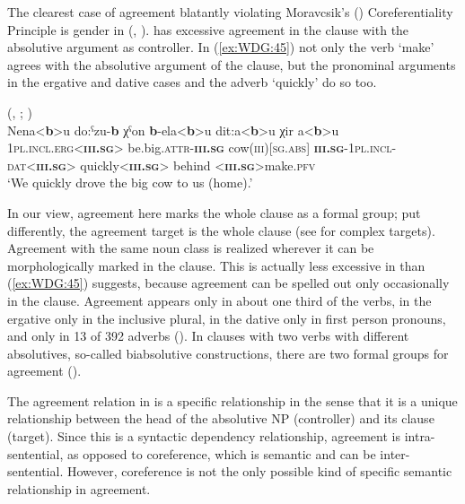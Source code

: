 \documentclass[output=collectionpaper]{langsci/langscibook}
\begin{document}
The clearest case of agreement blatantly violating Moravcsik's (\citeyear[363]{Moravcsik1978}) Coreferentiality Principle is gender in  (, ).  has excessive agreement in the clause with the absolutive argument as controller. In (\ref{ex:WDG:45}) not only the verb `make' agrees with the absolutive argument of the clause, but the pronominal arguments in the ergative and dative cases and the adverb `quickly' do so too.

\ea\label{ex:WDG:45}
 (, ; \citealt[3]{Bond2016})\\
\gll Nena<\textbf{b}>u	do:ˁzu-\textbf{b}	χˁon \textbf{b}-ela<\textbf{b}>u	dit:a<\textbf{b}>u	χir	a<\textbf{b}>u\\
\textsc{1pl.incl.erg}<\textbf{\textsc{iii.sg}}>	be.big.\textsc{attr}-\textbf{\textsc{iii.sg}}	cow(\textsc{iii})[\textsc{sg.abs}] \textbf{\textsc{iii.sg}}-\textsc{1pl.incl-dat}<\textbf{\textsc{iii.sg}}>	quickly<\textbf{\textsc{iii.sg}}>	behind	<\textbf{\textsc{iii.sg}}>make.\textsc{pfv} \\
\glt `We quickly drove the big cow to us (home).'\\
\z

In our view, agreement here marks the whole clause as a formal group; put differently, the agreement target is the whole clause (see  for complex targets). Agreement with the same noun class is realized wherever it can be morphologically marked in the clause. This is actually less excessive in  than (\ref{ex:WDG:45}) suggests, because agreement can be spelled out only occasionally in the  clause. Agreement appears only in about one third of the verbs, in the ergative only in the inclusive plural, in the dative only in first person pronouns, and only in 13 of 392 adverbs (\citealt[70]{Bond2016}). In clauses with two verbs with different absolutives, so-called biabsolutive constructions, there are two formal groups for agreement (\citealt[90--111]{Chumakina2016}).

The agreement relation in  is a specific relationship in the sense that it is a unique relationship between the head of the absolutive NP (controller) and its clause (target). Since this is a syntactic dependency relationship,  agreement is intra-sentential, as opposed to coreference, which is semantic and can be inter-sentential. However, coreference is not the only possible kind of specific semantic relationship in agreement.
\end{document}
